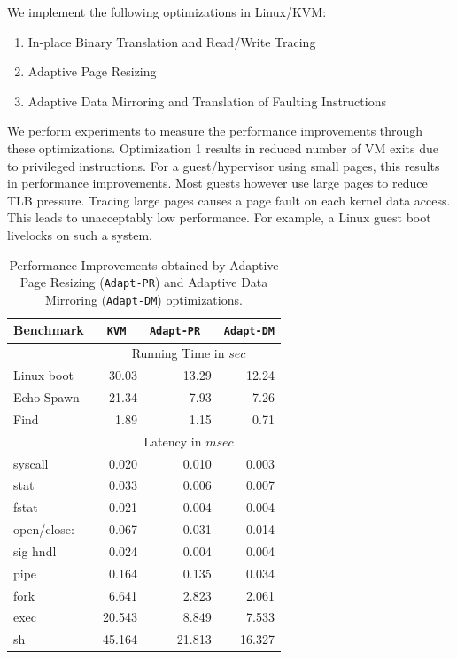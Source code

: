 \documentclass[10pt,twocolumn]{article}
\begin{document}
We implement the following optimizations in Linux/KVM:
\begin{enumerate}
  \item In-place Binary Translation and Read/Write Tracing
  \item Adaptive Page Resizing
  \item Adaptive Data Mirroring and Translation of Faulting Instructions
\end{enumerate}
We perform experiments to measure the performance improvements through these
optimizations. Optimization 1 results in reduced number of VM exits due
to privileged instructions. For a guest/hypervisor using small pages, this results
in performance improvements. Most guests however use large pages to reduce
TLB pressure. Tracing large pages causes a page fault on each kernel data access.
This leads to unacceptably low performance. For example, a Linux guest boot livelocks
on such a system.
\begin{table}
\centering
      \begin{tabular}{|l| r r r |} \hline
        Benchmark\verb, ,& {\tt KVM} \verb, , & {\tt Adapt-PR} \verb, , & {\tt Adapt-DM}  \\ \hline
     & \multicolumn{3}{c|}{ Running Time in $sec$}\\ \cline {2-4}  
Linux boot	&	30.03	&	13.29	&	12.24	\\
Echo Spawn	&	21.34	&	7.93	&	7.26	\\
Find	&	1.89	&	1.15	&	0.71	\\
\cline{2-4}
	   
     & \multicolumn{3}{c|}{Latency in $msec$}\\  \cline{2-4}
syscall	&	0.020	&	0.010	&	0.003	\\
stat	&	0.033	&	0.006	&	0.007	\\
fstat	&	0.021	&	0.004	&	0.004	\\
open/close:	&	0.067	&	0.031	&	0.014	\\
sig hndl	&	0.024	&	0.004	&	0.004	\\
pipe 	&	0.164	&	0.135	&	0.034	\\
fork	&	6.641	&	2.823	&	2.061	\\
exec	&	20.543	&	8.849	&	7.533	\\
sh	&	45.164	&	21.813	&	16.327	\\
 \hline
      \end{tabular}
\label{tab:detailed_results}
\caption{Performance Improvements obtained by Adaptive Page Resizing ({\tt Adapt-PR}) and Adaptive Data Mirroring ({\tt Adapt-DM}) optimizations.}
\end{table} 
\end{document}
